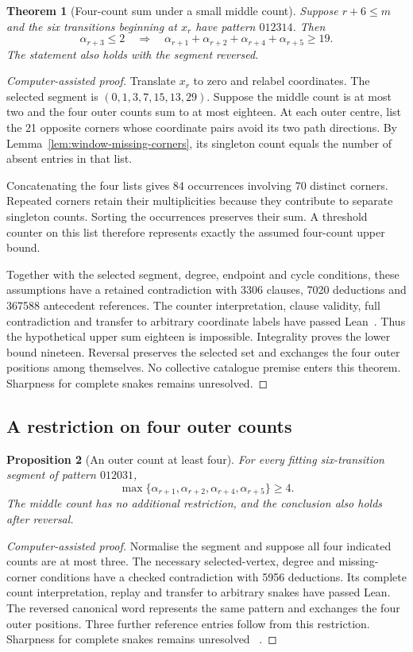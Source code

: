 \documentclass[11pt,a4paper]{article}
\newtheorem{theorem}{Theorem}[section]
\newtheorem{proposition}[theorem]{Proposition}
\theoremstyle{definition}
\theoremstyle{remark}
\begin{document}
\begin{theorem}[Four-count sum under a small middle count]\label{thm:outer-four-sum}
Suppose $r+6\le m$ and the six transitions beginning at $x_r$ have pattern
$012314$. Then
\[
\alpha_{r+3}\le2
\quad\Longrightarrow\quad
\alpha_{r+1}+\alpha_{r+2}+\alpha_{r+4}+\alpha_{r+5}\ge19.
\]
The statement also holds with the segment reversed.
\end{theorem}
\begin{proof}[Computer-assisted proof]
Translate $x_r$ to zero and relabel coordinates. The selected segment is
$(0,1,3,7,15,13,29)$. Suppose the middle count is at most two and the four
outer counts sum to at most eighteen. At each outer centre, list the 21
opposite corners whose coordinate pairs avoid its two path directions.
By Lemma~\ref{lem:window-missing-corners}, its singleton count equals the
number of absent entries in that list.

Concatenating the four lists gives 84 occurrences involving 70 distinct
corners. Repeated corners retain their multiplicities because they
contribute to separate singleton counts. Sorting the occurrences preserves
their sum. A threshold counter on this list therefore represents exactly
the assumed four-count upper bound.

Together with the selected segment, degree, endpoint and cycle conditions,
these assumptions have a retained contradiction with 3306 clauses, 7020
deductions and 367588 antecedent references. The counter interpretation,
clause validity, full contradiction and transfer to arbitrary coordinate
labels have passed Lean~\cite{sumbudgetarchive}. Thus the hypothetical
upper sum eighteen is impossible. Integrality proves the lower bound
nineteen. Reversal preserves the selected set and exchanges the four outer
positions among themselves. No collective catalogue premise enters this
theorem. Sharpness for complete snakes remains unresolved.
\end{proof}

\subsection{A restriction on four outer counts}\label{sec:outer-012031}
\begin{proposition}[An outer count at least four]\label{prop:outer-012031}
For every fitting six-transition segment of pattern $012031$,
\[
\max\{\alpha_{r+1},\alpha_{r+2},\alpha_{r+4},\alpha_{r+5}\}\ge4.
\]
The middle count has no additional restriction, and the conclusion also
holds after reversal.
\end{proposition}
\begin{proof}[Computer-assisted proof]
Normalise the segment and suppose all four indicated counts are at most
three. The necessary selected-vertex, degree and missing-corner conditions
have a checked contradiction with 5956 deductions. Its complete count
interpretation, replay and transfer to arbitrary snakes have passed Lean.
The reversed canonical word represents the same pattern and exchanges the
four outer positions. Three further reference entries follow from this
restriction. Sharpness for complete snakes remains unresolved
~\cite{latersumarchive}.
\end{proof}
\end{document}
